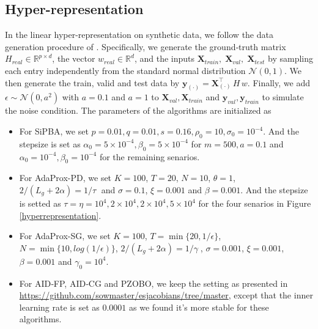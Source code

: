 \documentclass{article}
\begin{document}
    \subsection{Hyper-representation}\label{hyperappendix}
    In the linear hyper-representation on synthetic data, we follow the data generation procedure of \cite{sow2022convergence}. Specifically, we generate the ground‐truth matrix 
    $H_{real}\in\mathbb{R}^{p\times d}$, 
    the vector 
    $w_{real}\in\mathbb{R}^{d}$, 
    and the inputs 
    $\mathbf{X}_{train},\;\mathbf{X}_{val},\;\mathbf{X}_{test}$
    by sampling each entry independently from the standard normal distribution \(\mathcal{N}(0,1)\). We then generate the train, valid and test data by
    $
        \mathbf{y}_{(\cdot)}= \mathbf{X}_{(\cdot)}^{\!\top}\,H\,w.$
    Finally,  we add $\epsilon\sim\mathcal{N}(0,a^2)$ with $a=0.1$ and $a=1$ to $\mathbf{X}_{val},\mathbf{X}_{train}$ and $\mathbf{y}_{val},\mathbf{y}_{train}$  to simulate the noise condition.
    The parameters of the algorithms are initialized as
    \begin{itemize}
        \item For SiPBA, we set
        $p = 0.01,
    q = 0.01,s=0.16,
    \rho_0=10,\sigma_0 = 10^{-4}.$
    And the stepsize is set as $\alpha_0=5\times10^{-4}, \beta_0=5\times10^{-4}$ for $m=500, a=0.1$ and $\alpha_0=10^{-4}, \beta_0=10^{-4}$ for the remaining senarios.
    \item For AdaProx-PD, we set $K=100$, $T=20$, $N=10$, $\theta=1$, $2/(L_g+2\alpha)=1/\tau\; $ and $\sigma=0.1$, $\xi=0.001$ and $\beta=0.001$. And the stepsize is setted as  $\tau=\eta=10^4,2\times10^4,2\times10^4,5\times10^4$ for the four senarios in Figure \ref{hyperrepresentation}.
    \item For AdaProx-SG, we set $K=100$, $T=\min\{20,1/\epsilon\}$, $N=\min\{10,log(1/\epsilon)\}$,  $2/(L_g+2\alpha)=1/\gamma\; $,  $\sigma=0.001$, $\xi=0.001$, $\beta=0.001$ and $\gamma_0=10^4$.
    \item For AID‐FP, AID‐CG and PZOBO, we keep  the setting as presented in \url{https://github.com/sowmaster/esjacobians/tree/master}, except that the inner learning rate is set as $0.0001$ as we found it's more stable for these algorithms. 
    \end{itemize}
\end{document}
